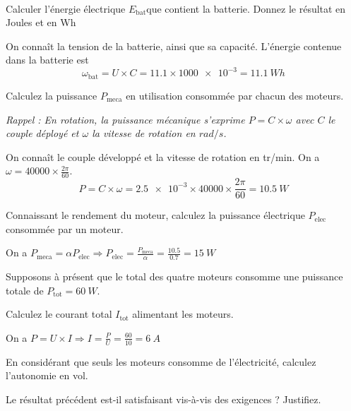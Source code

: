 \documentclass[10pt,fleqn]{article} %
\begin{document}
\begin{exercise}~

\begin{question}
  Calculer l’énergie électrique $E_\text{bat}$que contient la batterie. Donnez le résultat en Joules et en \si{Wh}
\end{question}
\begin{solution}
  On connaît la tension de la batterie, ainsi que sa capacité. L'énergie 
  contenue dans la batterie est $$\omega_\text{bat} = U\times C = 11.1 \times \num{1000e-3}=\SI{11.1}{Wh} $$
\end{solution}
\begin{question}
    Calculez la puissance $P_\text{meca}$ en utilisation consommée par chacun des moteurs.
    
    \textit{Rappel : En rotation, la puissance mécanique s'exprime $P = C\times \omega$ avec $C$ le couple déployé et $\omega$ la vitesse de rotation en $\si{rad/s}$.}
\end{question}
\begin{solution}
On connaît le couple développé et la vitesse de rotation en \si{tr/min}. On a $\omega = 40000\times \frac{2\pi}{60}$. $$P = C\times\omega = \num{2.5e-3}\times 40000 \times \frac{2\pi}{60} = \SI{10.5}{W} $$
\end{solution}

\begin{question}
  Connaissant le rendement du moteur, calculez la puissance électrique $P_\text{elec}$ consommée par un moteur. 
\end{question}
\begin{solution}
  On a $P_\text{meca} = \alpha P_\text{elec} \Rightarrow P_\text{elec} = \frac{P_\text{meca}}{\alpha} = \frac{10.5}{0.7} = \SI{15}{W}$
\end{solution}

\begin{question}
  Supposons à présent que le total des quatre moteurs consomme une puissance totale de $P_\text{tot} = \SI{60}{W}$.
  
  Calculez le courant total $I_\text{tot}$ alimentant les moteurs. 
\end{question}
\begin{solution}
  On a $P = U\times I \Rightarrow I = \frac{P}{U} = \frac{60}{10} = \SI{6}{A}$
\end{solution}

\begin{question}
    En considérant que seuls les moteurs consomme de l'électricité, calculez l'autonomie en vol. 
\end{question}


\begin{question}
    Le résultat précédent est-il satisfaisant vis-à-vis des exigences ? Justifiez.
\end{question}
\end{exercise}
\end{document}

